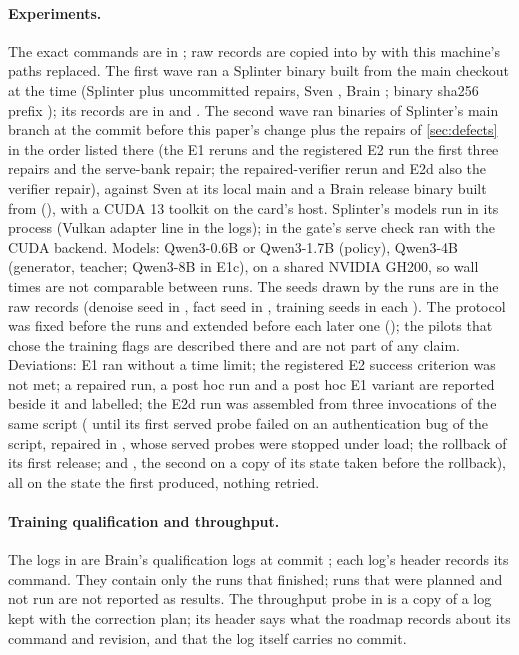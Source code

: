 \paragraph{Experiments.} The exact commands are in ; raw records
are copied into  by  with this machine's paths replaced.
The first wave ran a Splinter binary built from the main checkout at the time (Splinter
 plus uncommitted repairs, Sven , Brain ; binary sha256
prefix ); its records are in  and . The second wave
ran binaries of Splinter's main branch at the commit before this paper's change plus the repairs of
\cref{sec:defects} in the order listed there (the E1 reruns and the registered E2 run the first three
repairs and the serve-bank repair; the repaired-verifier rerun and E2d also the verifier repair), against Sven
at its local main  and a Brain release binary built from 
(), with a CUDA 13 toolkit on the card's host. Splinter's models run in its process
(Vulkan adapter line in the logs);  in the gate's serve check ran with the CUDA backend.
Models: Qwen3-0.6B or Qwen3-1.7B (policy), Qwen3-4B (generator, teacher; Qwen3-8B in E1c), on a shared NVIDIA GH200, so wall times are not
comparable between runs. The seeds drawn by the runs are in the raw records (denoise seed in
, fact seed in , training seeds in each ). The protocol was
fixed before the runs and extended before each later one (); the pilots that chose the
training flags are described there and are not part of any claim. Deviations: E1 ran without a time limit; the registered E2 success
criterion was not met; a repaired run, a post hoc run and a post hoc E1 variant are reported beside it and labelled;
the E2d run was assembled from three invocations of the same script
( until its first served probe failed on an authentication bug of the script, repaired in , whose
served probes were stopped under load; the rollback of its first release; and , the second  on a copy
of its state taken before the rollback), all on the state
the first produced, nothing retried.

\paragraph{Training qualification and throughput.} The logs in  are Brain's
qualification logs at commit \mEFourCommit{}; each log's header records its command. They contain
only the runs that finished; runs that were planned and not run are not reported as results. The
throughput probe in  is a copy of a log kept with the correction plan;
its header says what the roadmap records about its command and revision, and that the log itself
carries no commit.

